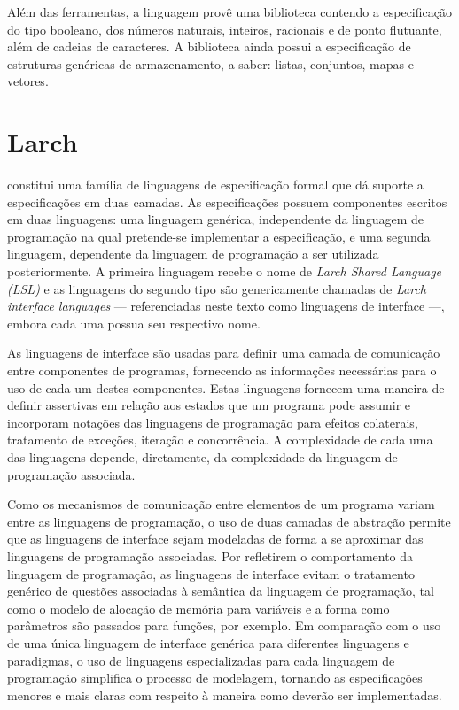 Além das ferramentas, a linguagem \Maude provê uma biblioteca contendo a especificação do tipo booleano, dos números naturais, inteiros, racionais e de ponto flutuante, além de cadeias de caracteres. A biblioteca ainda possui a especificação de estruturas genéricas de armazenamento, a saber: listas, conjuntos, mapas e vetores.


\section{Larch}\label{chap:revisaobib:larch}

\Larch \cite{LarchBook} constitui uma família de linguagens de especificação formal que dá suporte a especificações em duas camadas.
As especificações possuem componentes escritos em duas linguagens: uma linguagem genérica, independente da linguagem de programação na qual pretende-se implementar a especificação, e uma segunda linguagem, dependente da linguagem de programação a ser utilizada posteriormente.
A primeira linguagem recebe o nome de \textit{Larch Shared Language (LSL)} e as linguagens do segundo tipo são genericamente chamadas de \textit{Larch interface languages} --- referenciadas neste texto como linguagens de interface ---, embora cada uma possua seu respectivo nome.

As linguagens de interface são usadas para definir uma camada de comunicação entre componentes de programas, fornecendo as informações necessárias para o uso de cada um destes componentes.
Estas linguagens fornecem uma maneira de definir assertivas em relação aos estados que um programa pode assumir e incorporam notações das linguagens de programação para efeitos colaterais, tratamento de exceções, iteração e concorrência.
A complexidade de cada uma das linguagens depende, diretamente, da complexidade da linguagem de programação associada.

Como os mecanismos de comunicação entre elementos de um programa variam entre as linguagens de programação, o uso de duas camadas de abstração permite que as linguagens de interface sejam modeladas de forma a se aproximar das linguagens de programação associadas.
Por refletirem o comportamento da linguagem de programação, as linguagens de interface evitam o tratamento genérico de questões associadas à semântica da linguagem de programação, tal como o modelo de alocação de memória para variáveis e a forma como parâmetros são passados para funções, por exemplo.
Em comparação com o uso de uma única linguagem de interface genérica para diferentes linguagens e paradigmas, o uso de linguagens especializadas para cada linguagem de programação simplifica o processo de modelagem, tornando as especificações menores e mais claras com respeito à maneira como deverão ser implementadas.

